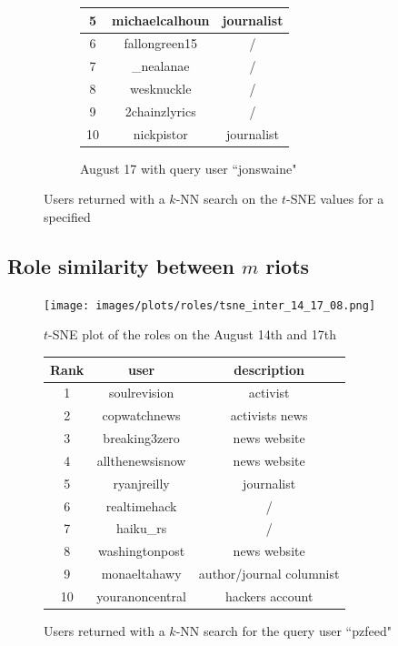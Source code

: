 \documentclass[a4paper,twoside,12pt,openright]{report}
\begin{document}
\begin{figure}[H]
\begin{subfigure}[t]{0.5\textwidth}
\begin{tabular}{ccc}
5 & michaelcalhoun & journalist \\ \hline
6 & fallongreen15 & / \\ \hline
7 & \_nealanae & / \\ \hline
8 & wesknuckle & / \\ \hline
9 & 2chainzlyrics & / \\ \hline
10 & nickpistor & journalist \\ \hline
\hline
\end{tabular}
\caption{August 17 with query user ``jonswaine"}
\label{kNNRole17}
\end{subfigure}
\caption{Users returned with a $k$-NN search on the $t$-SNE values for a specified}
\label{kNNRoleA}
\end{figure}

\newpage

\subsection{Role similarity between $m$ riots}

\begin{figure}[H]
\centering
\texttt{[image: images/plots/roles/tsne\_inter\_14\_17\_08.png]}
\caption{$t$-SNE plot of the roles on the August 14th and 17th}
\label{}
\end{figure}


\begin{figure}[H]
  \centering
\begin{tabular}{ccc}
\hline
Rank & \textbf{user} & \textbf{description} \\ \hline \hline
1 & soulrevision & activist \\ \hline
2 & copwatchnews & activists news \\ \hline
3 & breaking3zero & news website \\ \hline
4 & allthenewsisnow & news website \\ \hline
5 & ryanjreilly & journalist \\ \hline
6 & realtimehack & / \\ \hline
7 & haiku\_rs & / \\ \hline
8 & washingtonpost & news website \\ \hline
9 & monaeltahawy & author/journal columnist \\ \hline
10 & youranoncentral & hackers account \\ \hline
\hline
\end{tabular}
\caption{Users returned with a $k$-NN search for the query user ``pzfeed"}
\end{figure}
\end{document}
